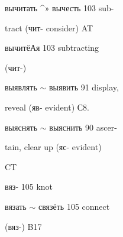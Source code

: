 \begin{minipage}[t]{0.475\textwidth}
\noindent вычитать \textasciicircum{}» вычесть 103 sub-\par
\noindent tract (чит- consider) AT\par
\noindent вычитёАя 103 subtracting\par
\noindent (чит-)\par
\noindent выявлять $\sim$ выявить 91 display,\par
\noindent reveal (яв- evident) С8.\par
\noindent выяснять $\sim$ выяснить 90 ascer-\par
\noindent tain, clear up (яс- evident)\par
\noindent CT\par
\noindent вяз- 105 knot\par
\noindent вязать $\sim$ связёть 105 connect\par
\noindent (вяз-) B17\par
\end{minipage}\hfill
